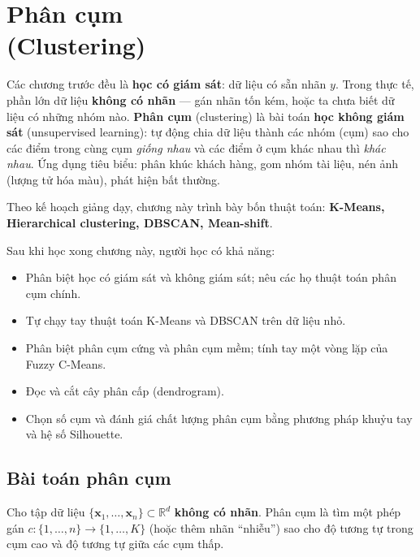 
\chapter{Phân cụm \\ (Clustering)}
\label{chap:clustering}

Các chương trước đều là \textbf{học có giám sát}: dữ liệu có sẵn nhãn $y$. Trong thực tế, phần lớn dữ liệu \textbf{không có nhãn} --- gán nhãn tốn kém, hoặc ta chưa biết dữ liệu có những nhóm nào. \textbf{Phân cụm} (clustering) là bài toán \textbf{học không giám sát} (unsupervised learning): tự động chia dữ liệu thành các nhóm (cụm) sao cho các điểm trong cùng cụm \textit{giống nhau} và các điểm ở cụm khác nhau thì \textit{khác nhau}. Ứng dụng tiêu biểu: phân khúc khách hàng, gom nhóm tài liệu, nén ảnh (lượng tử hóa màu), phát hiện bất thường.

Theo kế hoạch giảng dạy, chương này trình bày bốn thuật toán: \textbf{K-Means, Hierarchical clustering, DBSCAN, Mean-shift}.

\noindent Sau khi học xong chương này, người học có khả năng:
\begin{itemize}
    \item Phân biệt học có giám sát và không giám sát; nêu các họ thuật toán phân cụm chính.
    \item Tự chạy tay thuật toán K-Means và DBSCAN trên dữ liệu nhỏ.
    \item Phân biệt phân cụm cứng và phân cụm mềm; tính tay một vòng lặp của Fuzzy C-Means.
    \item Đọc và cắt cây phân cấp (dendrogram).
    \item Chọn số cụm và đánh giá chất lượng phân cụm bằng phương pháp khuỷu tay và hệ số Silhouette.
\end{itemize}

\section{Bài toán phân cụm}

\begin{definition}
Cho tập dữ liệu $\{\mathbf{x}_1, \dots, \mathbf{x}_n\} \subset \mathbb{R}^d$ \textbf{không có nhãn}. Phân cụm là tìm một phép gán $c: \{1, \dots, n\} \to \{1, \dots, K\}$ (hoặc thêm nhãn ``nhiễu'') sao cho độ tương tự trong cụm cao và độ tương tự giữa các cụm thấp.
\end{definition}


